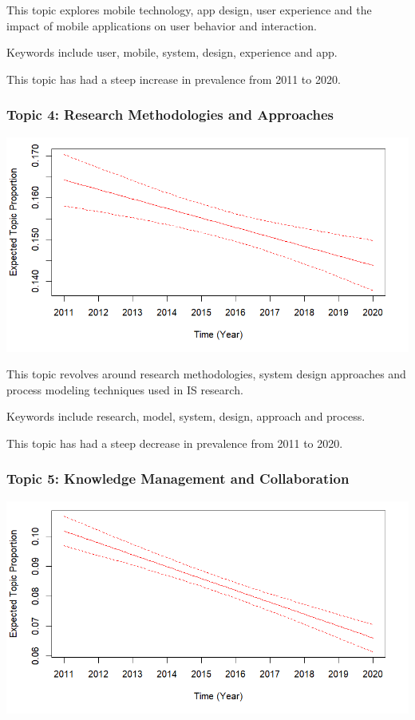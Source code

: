 \documentclass[
  letterpaper,
  DIV=11,
  numbers=noendperiod]{scrartcl}
\begin{document}
This topic explores mobile technology, app design, user experience and
the impact of mobile applications on user behavior and interaction.

Keywords include user, mobile, system, design, experience and app.

This topic has had a steep increase in prevalence from 2011 to 2020.

\hypertarget{topic-4-research-methodologies-and-approaches}{%
\subsubsection{Topic 4: Research Methodologies and
Approaches}\label{topic-4-research-methodologies-and-approaches}}

\includegraphics{images/topic4.png}

This topic revolves around research methodologies, system design
approaches and process modeling techniques used in IS research.

Keywords include research, model, system, design, approach and process.

This topic has had a steep decrease in prevalence from 2011 to 2020.

\hypertarget{topic-5-knowledge-management-and-collaboration}{%
\subsubsection{Topic 5: Knowledge Management and
Collaboration}\label{topic-5-knowledge-management-and-collaboration}}

\includegraphics{images/topic5.png}
\end{document}
